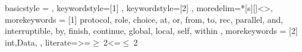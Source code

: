 %
{%
	basicstyle   = \CODESTYLE\footnotesize,
	keywordstyle=[1]{
	\!\!\!\color{dkblue}
	\CODESTYLE\footnotesize},
	keywordstyle=[2]{
	\!\!\!\color{dkgreen}
	\CODESTYLE\footnotesize},
        moredelim=*[s][\footnotesize\color{dkgreen}]{<}{>},
        morekeywords =
	[1]{%
		protocol, role, choice, at, or, from, to, rec, parallel,
                and, interruptible, by, finish, continue, global, local, self, within
	},
	morekeywords =
	[2]{%
                int,Data,
	},
       literate={>=}{$\geq\ $}{2}{<=}{$\leq\ $}{2}
}

%
{
	\lstset{style=SJ}
}
{
}


%
\newcommand{\REF}[1]{\S\,\ref{#1}}

%
\newcommand{\OPASSIGN}{\, \CODE{:=} \,}
\newcommand{\OPEQ}{\ensuremath{=}}
\newcommand{\OPDEC}{\CODE{--}}
\newcommand{\OPINC}{\CODE{++}}
\newcommand{\OPSEQ}{\CODE{;}}
\newcommand{\OPNOT}{\ensuremath{\neg}}

\newcommand{\OLINE}[1]{\ensuremath{\overline{#1}}}  %
\newcommand{\SET}[1]{\ensuremath{\{ #1 \}}}         %
\newcommand{\FUN}[2]{\ensuremath{\mathsf{#1}(#2)}}  %

%
\newcommand{\KWORD}[1]{\ensuremath{\mathsf{#1}}}
\newcommand{\DTYPE}[1]{\ensuremath{\mathtt{#1}}}  %
\newcommand{\DVAL}[1]{\ensuremath{\mathtt{#1}}}   %
\newcommand{\PPAR}{\ensuremath{\, | \,}}
\newcommand{\PPARGROUP}[1]{\ensuremath{(#1)}}
\newcommand{\PIF}{\ensuremath{\KWORD{if}}}
\newcommand{\PTHEN}{\ensuremath{\KWORD{then}}}
\newcommand{\PELSE}{\ensuremath{\KWORD{else}}}
\newcommand{\PNIL}{\ensuremath{\mathbf{0}}}
\newcommand{\EMPTY}{\ensuremath{\epsilon}}

%
\newcommand{\LAB}[1]
	{\ensuremath{#1}}            %
\newcommand{\LABVAL}[1]
	{\ensuremath{\mathtt{#1}}}   %
\newcommand{\ROLE}[1]
	{\participant{#1}}           %
\newcommand{\PARTY}[1]
	{\ensuremath{\mathsf{#1}}}   %
\newcommand{\MSGlxS}[3]
	{\ensuremath{\MSGlx{#1}{#2\!:\!#3}}}  %
\newcommand{\MSGlx}[2]
	{\ensuremath{#1 (#2)}}              %
\newcommand{\MSGlS}[2]
	{\MSGlx{#1}{#2}}                    %
\newcommand{\BRANCH}[1]
	{\ensuremath{\SET{#1}}}         %
\newcommand{\MUREC}[1]
	{\ensuremath{\mu \RECVAR{#1}}}  %
\newcommand{\RECVAR}[1]
	{\ensuremath{\keyword{#1}}}     %

